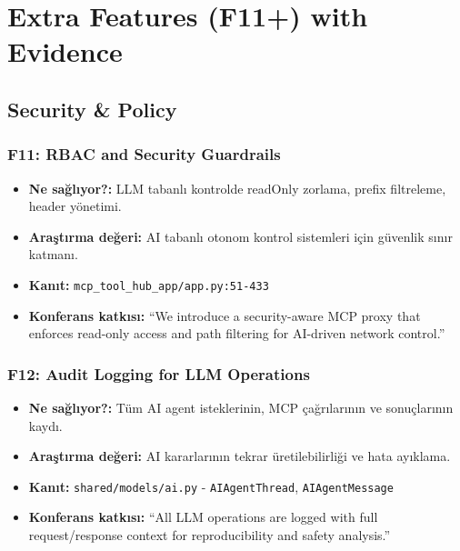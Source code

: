\documentclass[10pt,a4paper]{article}
\begin{document}
\section{Extra Features (F11+) with Evidence}

\subsection{Security \& Policy}

\subsubsection{F11: RBAC and Security Guardrails}

\begin{itemize}
\item \textbf{Ne sağlıyor?:} LLM tabanlı kontrolde readOnly zorlama, prefix filtreleme, header yönetimi.
\item \textbf{Araştırma değeri:} AI tabanlı otonom kontrol sistemleri için güvenlik sınır katmanı.
\item \textbf{Kanıt:} \texttt{mcp\_tool\_hub\_app/app.py:51-433}
\item \textbf{Konferans katkısı:} ``We introduce a security-aware MCP proxy that enforces read-only access and path filtering for AI-driven network control.''
\end{itemize}

\subsubsection{F12: Audit Logging for LLM Operations}

\begin{itemize}
\item \textbf{Ne sağlıyor?:} Tüm AI agent isteklerinin, MCP çağrılarının ve sonuçlarının kaydı.
\item \textbf{Araştırma değeri:} AI kararlarının tekrar üretilebilirliği ve hata ayıklama.
\item \textbf{Kanıt:} \texttt{shared/models/ai.py} - \texttt{AIAgentThread}, \texttt{AIAgentMessage}
\item \textbf{Konferans katkısı:} ``All LLM operations are logged with full request/response context for reproducibility and safety analysis.''
\end{itemize}
\end{document}

